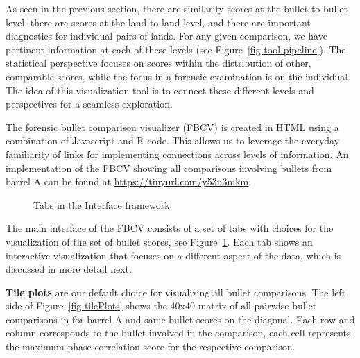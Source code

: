 \documentclass[
  12pt]{article}
\begin{document}
As seen in the previous section, there are similarity scores at the
bullet-to-bullet level, there are scores at the land-to-land level, and
there are important diagnostics for individual pairs of lands. For any
given comparison, we have pertinent information at each of these levels
(see Figure~\ref{fig-tool-pipeline}). The statistical perspective
focuses on scores within the distribution of other, comparable scores,
while the focus in a forensic examination is on the individual. The idea
of this visualization tool is to connect these different levels and
perspectives for a seamless exploration.

The forensic bullet comparison visualizer (FBCV) is created in HTML
using a combination of Javascript and R code. This allows us to leverage
the everyday familiarity of links for implementing connections across
levels of information. An implementation of the FBCV showing all
comparisons involving bullets from barrel A can be found at
\url{https://tinyurl.com/y53n3mkm}.

\begin{figure}[H]


\caption{\label{fig-framework-interface}Tabs in the Interface framework}

\end{figure}%

The main interface of the FBCV consists of a set of tabs with choices
for the visualization of the set of bullet scores, see
Figure~\ref{fig-framework-interface}. Each tab shows an interactive
visualization that focuses on a different aspect of the data, which is
discussed in more detail next. \hfill\newline

\textbf{Tile plots} are our default choice for visualizing all bullet
comparisons. The left side of Figure~\ref{fig-tilePlots} shows the 40x40
matrix of all pairwise bullet comparisons in for barrel A and
same-bullet scores on the diagonal. Each row and column corresponds to
the bullet involved in the comparison, each cell represents the maximum
phase correlation score for the respective comparison.
\end{document}

